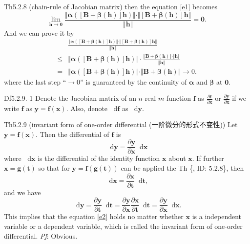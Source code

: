 \documentclass{article}
\newcommand{\parfrac}[2]{\frac{\partial #1}{\partial #2}}
\newcommand{\dif}{\mathop{}\!\mathrm{d}}
\begin{document}
\begin{Th}{Th5.2.8 (chain-rule of Jacobian matrix)}
    then the equation \eqref{e1} becomes
    $$ \lim\limits_{\pmb{h}\to\pmb{0}}\frac{\Vert\pmb{\alpha}([\pmb{B} + \pmb{\beta}(\pmb{h})]\pmb{h})\Vert \cdot \Vert [\pmb{B} + \pmb{\beta}(\pmb{h})]\pmb{h}\Vert}{\Vert\pmb{h}\Vert} = \pmb{0}. $$
    And we can prove it by
    $$ 
    \begin{aligned}
        & \frac{\Vert\pmb{\alpha}([\pmb{B} + \pmb{\beta}(\pmb{h})]\pmb{h})\Vert \cdot \Vert [\pmb{B} + \pmb{\beta}(\pmb{h})]\pmb{h}\Vert}{\Vert\pmb{h}\Vert} \\
        \leq & \Vert\pmb{\alpha}([\pmb{B} + \pmb{\beta}(\pmb{h})]\pmb{h})\Vert \cdot \frac{\Vert \pmb{B} + \pmb{\beta}(\pmb{h})\Vert \cdot \Vert\pmb{h}\Vert}{\Vert\pmb{h}\Vert} \\
        = & \Vert\pmb{\alpha}([\pmb{B} + \pmb{\beta}(\pmb{h})]\pmb{h})\Vert \cdot \Vert \pmb{B} + \pmb{\beta}(\pmb{h})\Vert \rightarrow 0.
    \end{aligned}
    $$
    where the last step ``$\rightarrow 0$'' is guaranteed by the continuity of $\pmb{\alpha}$ and $\pmb{\beta}$ at $\pmb{0}$.
\end{Th}

\begin{Df}{Df5.2.9.-1}
    Denote the Jacobian matrix of an $n$-real $m$-function $\pmb{f}$ as $\parfrac{\pmb{f}}{\pmb{x}}$ or $\parfrac{\pmb{y}}{\pmb{x}}$ if we write $\pmb{f}$ as $\pmb{y} = \pmb{f}(\pmb{x})$. Also, denote $\dif\pmb{f}$ as $\dif\pmb{y}$.
\end{Df}

\begin{Th}{Th5.2.9 (invariant form of one-order differential (一阶微分的形式不变性))}
    Let $\pmb{y} = \pmb{f}(\pmb{x})$. Then the differential of $\pmb{f}$ is
    \begin{equation}
        \dif\pmb{y} = \parfrac{\pmb{y}}{\pmb{x}}\dif\pmb{x}
        \label{e2}
    \end{equation}
    where $\dif\pmb{x}$ is the differential of the identity function $\pmb{x}$ about $\pmb{x}$.
    If further $\pmb{x} = \pmb{g}(\pmb{t})$ so that for $\pmb{y} = \pmb{f}(\pmb{g}(\pmb{t}))$ can be applied the Th \{, ID: 5.2.8\}, then
    $$ \dif\pmb{x} = \parfrac{\pmb{x}}{\pmb{t}}\dif\pmb{t}, $$
    and we have
    $$ \dif\pmb{y} = \parfrac{\pmb{y}}{\pmb{t}}\dif\pmb{t} = \parfrac{\pmb{y}}{\pmb{x}}\parfrac{\pmb{x}}{\pmb{t}}\dif\pmb{t} = \parfrac{\pmb{y}}{\pmb{x}}\dif\pmb{x}. $$
    This implies that the equation \eqref{e2} holds no matter whether $\pmb{x}$ is a independent variable or a dependent variable, \textcolor{Df}{which is called the invariant form of one-order differential.}
    \tcblower
    \textit{Pf}: Obvious.
\end{Th}
\end{document}
